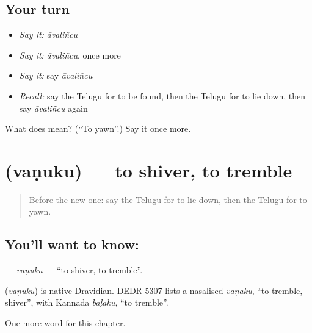 \subsection*{Your turn}
\begin{itemize}
\raggedright
  \item \emph{Say it:} \emph{āvaliñcu}
  \item \emph{Say it:} \emph{āvaliñcu}, once more
  \item \emph{Say it:} say \emph{āvaliñcu}
  \item \emph{Recall:} say the Telugu for to be found, then the Telugu for to lie down, then say \emph{āvaliñcu} again
\end{itemize}

\begin{tcolorbox}[breakable,colback=teal!4,colframe=teal!35!black,title={Before you move on}]
What does  mean? (\textquotedblleft{}To yawn\textquotedblright{}.) Say it once more.
\end{tcolorbox}
\section[\texorpdfstring{\te{వణుకు} (vaṇuku)}{వణుకు (vaṇuku)}]{ (vaṇuku) — to shiver, to tremble}

\label{lesson:TE-C201-vanuku}



\begin{quote}
Before the new one: say the Telugu for to lie down, then the Telugu for to yawn.
\end{quote}

\subsection*{You'll want to know: }
\textbf{} — \emph{vaṇuku} — \textquotedblleft{}to shiver, to tremble\textquotedblright{}.

\begin{cousinweb}
\textbf{} (\emph{vaṇuku}) is native Dravidian. DEDR 5307 lists a nasalised \emph{vaṇaku}, \textquotedblleft{}to tremble, shiver\textquotedblright{}, with Kannada \emph{baḷaku}, \textquotedblleft{}to tremble\textquotedblright{}.
\end{cousinweb}

\begin{grammarlens}[title={What you've built}]
One more word for this chapter.
\end{grammarlens}

